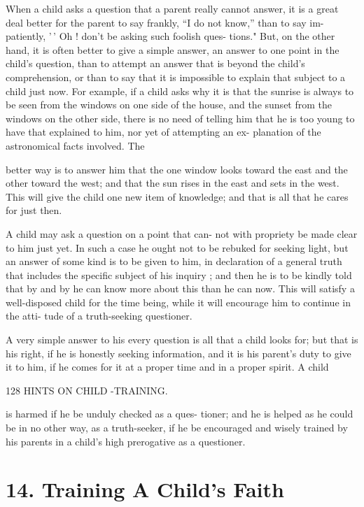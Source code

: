 \documentclass[
]{book}
\begin{document}
When a child asks a question that a parent really cannot answer, it is a great deal better for the parent to say frankly, ``I do not know,'' than to say im- patiently, '\,' Oh ! don't be asking such foolish ques- tions." But, on the other hand, it is often better to give a simple answer, an answer to one point in the child's question, than to attempt an answer that is beyond the child's comprehension, or than to say that it is impossible to explain that subject to a child just now. For example, if a child asks why it is that the sunrise is always to be seen from the windows on one side of the house, and the sunset from the windows on the other side, there is no need of telling him that he is too young to have that explained to him, nor yet of attempting an ex- planation of the astronomical facts involved. The

better way is to answer him that the one window looks toward the east and the other toward the west; and that the sun rises in the east and sets in the west. This will give the child one new item of knowledge; and that is all that he cares for just then.

A child may ask a question on a point that can- not with propriety be made clear to him just yet. In such a case he ought not to be rebuked for seeking light, but an answer of some kind is to be given to him, in declaration of a general truth that includes the specific subject of his inquiry ; and then he is to be kindly told that by and by he can know more about this than he can now. This will satisfy a well-disposed child for the time being, while it will encourage him to continue in the atti- tude of a truth-seeking questioner.

A very simple answer to his every question is all that a child looks for; but that is his right, if he is honestly seeking information, and it is his parent's duty to give it to him, if he comes for it at a proper time and in a proper spirit. A child

128 HINTS ON CHILD -TRAINING.

is harmed if he be unduly checked as a ques- tioner; and he is helped as he could be in no other way, as a truth-seeker, if he be encouraged and wisely trained by his parents in a child's high prerogative as a questioner.

\hypertarget{training-a-childs-faith}{%
\chapter{14. Training A Child's Faith}\label{training-a-childs-faith}}
\end{document}
